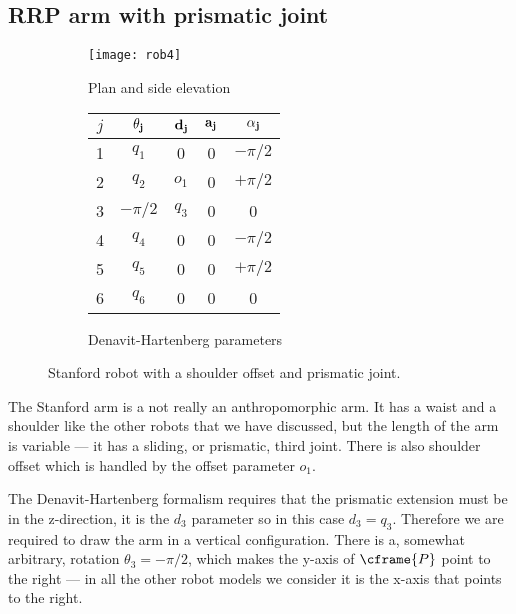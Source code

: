 \documentclass[11pt]{article}
\numberwithin{equation}{section}
\begin{document}
\pagebreak

\subsection{RRP arm with prismatic joint}

	\begin{figure}[h]
	\centering
	\begin{subfigure}[b]{0.6\textwidth}
	\centering
		\texttt{[image: rob4]}
		\caption{Plan and side elevation}
	\label{fig:rob4} 
	\end{subfigure}
	\begin{subfigure}[b]{0.3\textwidth}
		\begin{tabular}{|c|c|c|c|c|} \hline
			$j$ & $\bf \theta_j$ & $\bf d_j$ & $\bf a_j$ & $\bf \alpha_j$ \\ \hline
			\rowcolor{SkyBlue}1 &  $q_1$ & \cellcolor{White} 0 &  0 & $-\pi/2$ \\
			\rowcolor{SkyBlue}2 &  $q_2$ & $o_1$ & 0& $+\pi/2$ \\
			\rowcolor{SkyBlue}3 & $-\pi/2$ & $q_3$ & 0  & 0 \\
			\rowcolor{Peach}4 &  $q_4$ & 0  & 0 & $-\pi/2$  \\
			\rowcolor{Peach}5 &$q_5$ & 0 & 0 & $+\pi/2$ \\
			\cellcolor{Peach} 6 & \cellcolor{Peach} $q_6$ & 0 & 0 & 0 \\ \hline
		\end{tabular}
		\caption{Denavit-Hartenberg parameters}
		\label{fig:dh4}
	\end{subfigure}
	\caption{Stanford  robot with a shoulder offset and prismatic joint.}
	\end{figure}

The Stanford arm is a not really an anthropomorphic arm.  It has a waist and a shoulder like the other robots that we have discussed, but the
length of the arm is variable --- it has a  sliding, or prismatic, third joint.  There is also shoulder offset which is
handled by the offset parameter $o_1$.

The Denavit-Hartenberg formalism requires that the prismatic extension must be in the z-direction, it is the $d_3$ parameter so in this case
$d_3 = q_3$.
Therefore we are required to draw the arm in a vertical configuration.
There is a, somewhat arbitrary, rotation $\theta_3 = -\pi/2$, which makes the y-axis of $\cframe{P}$ point to the right --- in all the other robot models
we consider it is the x-axis that points to the right.
\end{document}

